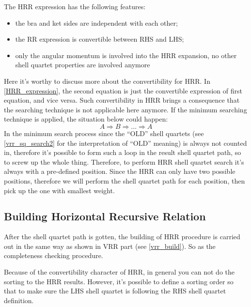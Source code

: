 The HRR expression has the following features:
\begin{itemize}
 \item the bra and ket sides are independent with each other;
 \item the RR expression is convertible between RHS and LHS;
 \item only the angular momentum is involved into the HRR expansion, 
 no other shell quartet properties are involved anymore
\end{itemize}

Here it's worthy to discuss more about the convertibility for HRR. 
In \ref{HRR_expression}, the second equation is just the convertible
expression of first equation, and vice versa. Such convertibility
in HRR brings a consequence that the searching technique is not 
applicable here anymore. If the minimum searching technique 
is applied, the situation below could happen: 
\begin{equation} 
A \Rightarrow B \Rightarrow \dots \Rightarrow A
\end{equation}
In the minimum search process since the ``OLD'' shell quartets (see 
\ref{vrr_sq_search2} for the interpretation of ``OLD'' meaning) 
is always not counted in, therefore it's possible to form such a loop
in the result shell quartet path, so to screw up the whole thing. 
Therefore, to perform HRR shell quartet search it's always with a 
pre-defined position. Since the HRR can only have two possible 
positions, therefore we will perform the shell quartet path for each
position, then pick up the one with smallest weight.

\subsection{Building Horizontal Recursive Relation}
%
%
\label{build_hrr}

After the shell quartet path is gotten, the building of HRR procedure 
is carried out in the same way as shown in VRR part (see \ref{vrr_build}).
So as the completeness checking procedure.

Because of the convertibility character of HRR, in general you can not
do the sorting to the HRR results. However, it's possible to define
a sorting order so that to make sure the LHS shell quartet is following
the RHS shell quartet definition.


